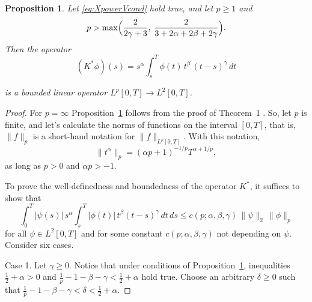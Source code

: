 \documentclass{article}
\theoremstyle{plain}
\newtheorem{prop}{Proposition}
\theoremstyle{remark}
\theoremstyle{definition}
\begin{document}
\begin{prop}
\label{prop:PW-L-cont}
Let \eqref{eq:XpowerVcond} hold true, and let
  $p\mathbin{\ge}1$ and
\begin{equation} \label{forseven} p>\max\Bigl( \frac{2}{2\gamma+3},\:\allowbreak
     \frac{2}{3+2\alpha+2\beta+2\gamma}\Bigr).\end{equation}
Then the operator
\begin{equation}\label{operator}
(K^* \phi)(s) = s^\alpha \int_s^T \phi(t)\, t^\beta \, (t-s)^\gamma\, dt
\end{equation}
	
 
is a bounded linear operator $L^p[0,T]\to L^2[0,T]$.
\end{prop}

 
	 
	
\begin{proof}For $p=\infty$  Proposition~\ref{prop:PW-L-cont} follows
	from the proof of Theorem~1 \cite{Part 1}. So, let $p$ is finite, and 
 let's calculate the norms of functions on the interval
	$[0,T]$,  that is, $\|f\|_p$ is a short-hand notation for
	$\|f\|_{L^p[0,T]}$.
	With this notation,
	$$\|t^\alpha\|_p = (\alpha p + 1)^{-1/p}T^{\alpha + 1/p},$$
	as long as $p>0$ and $\alpha p > -1$.

	To prove the well-definedness and boundedness of the operator $K^*$,
	it suffices to show that
	\begin{equation}
		\label{eq:todoPW-L-cont}
		\int_0^T |\psi(s)|\, s^\alpha
		\int_s^T |\phi(t)|\, t^\beta (t-s)^\gamma
		\, dt \, ds \le
		c(p;\alpha,\beta,\gamma) \, \|\psi\|_2 \, \|\phi\|_p
	\end{equation}
	for all $\psi\in L^2[0,T]$ and
	for some   constant  $c(p;\alpha,\beta,\gamma)$ not depending  on
	$\psi$.
Consider six cases.

Case 1. Let $\gamma\ge 0$.
	Notice that under conditions of Proposition~\ref{prop:PW-L-cont},
	inequalities
	$\frac12+\alpha>0$ and $\frac1p - 1 - \beta - \gamma < \frac12+\alpha$
	hold true.
	Choose an arbitrary $\delta\ge 0$ such that
	$\frac1p - 1 - \beta - \gamma < \delta < \frac12+\alpha$.


\end{proof}
\end{document}
